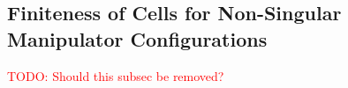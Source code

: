 \documentclass[Afour,sageh,times]{sagej}
\begin{document}
\subsection{Finiteness of Cells for Non-Singular Manipulator Configurations}\label{subsection_regular_finiteness}
\textcolor{red}{TODO: Should this subsec be removed? }
\end{document}
